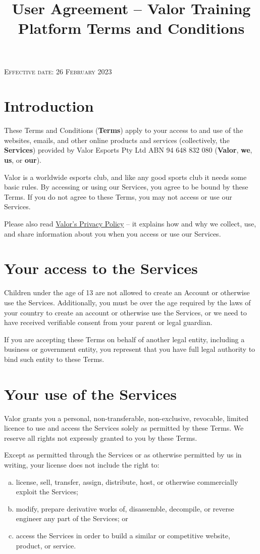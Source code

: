 \documentclass[10pt]{article}
\begin{document}
\title{User Agreement -- Valor Training Platform Terms and Conditions}

\textsc{Effective date: 26 February 2023}


\section{Introduction}
These Terms and Conditions (\textbf{Terms}) apply to your access to and use of the websites, emails, and other online products and services (collectively, the \textbf{Services}) provided by Valor Esports Pty Ltd ABN 94 648 832 080 (\textbf{Valor}, \textbf{we}, \textbf{us}, or \textbf{our}).

Valor is a worldwide esports club, and like any good sports club it needs some basic rules. By accessing or using our Services, you agree to be bound by these Terms. If you do not agree to these Terms, you may not access or use our Services.

Please also read \href{https://legal.valoresports.com/academy-policy-privacy-policy.html}{Valor's Privacy Policy} -- it explains how and why we collect, use, and share information about you when you access or use our Services.


\section{Your access to the Services}
Children under the age of 13 are not allowed to create an Account or otherwise use the Services. Additionally, you must be over the age required by the laws of your country to create an account or otherwise use the Services, or we need to have received verifiable consent from your parent or legal guardian.

If you are accepting these Terms on behalf of another legal entity, including a business or government entity, you represent that you have full legal authority to bind such entity to these Terms.


\section{Your use of the Services}
Valor grants you a personal, non-transferable, non-exclusive, revocable, limited licence to use and access the Services solely as permitted by these Terms. We reserve all rights not expressly granted to you by these Terms.

Except as permitted through the Services or as otherwise permitted by us in writing, your license does not include the right to:
\begin{enumerate}[(a)]
	\item
	license, sell, transfer, assign, distribute, host, or otherwise commercially exploit the Services;
	
	\item
	modify, prepare derivative works of, disassemble, decompile, or reverse engineer any part of the Services; or
	
	\item
	access the Services in order to build a similar or competitive website, product, or service.
\end{enumerate}
\end{document}
